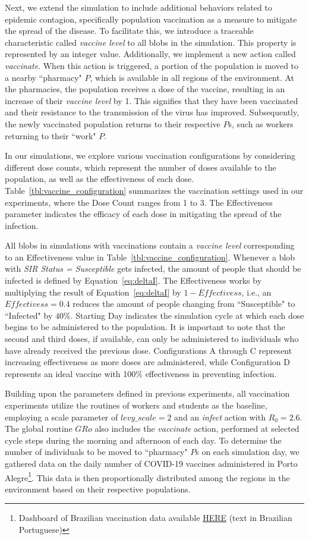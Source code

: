 \documentclass[pdflatex,sn-mathphys-num]{sn-jnl}%
\theoremstyle{thmstyleone}%
\theoremstyle{thmstyletwo}%
\theoremstyle{thmstylethree}%
\begin{document}
Next, we extend the simulation to include additional behaviors related to epidemic contagion, specifically population vaccination as a measure to mitigate the spread of the disease. To facilitate this, we introduce a traceable characteristic called \textit{vaccine level} to all blobs in the simulation. This property is represented by an integer value. Additionally, we implement a new action called \textit{vaccinate}. When this action is triggered, a portion of the population is moved to a nearby ``pharmacy" $P$, which is available in all regions of the environment. At the pharmacies, the population receives a dose of the vaccine, resulting in an increase of their \textit{vaccine level} by 1. This signifies that they have been vaccinated and their resistance to the transmission of the virus has improved. Subsequently, the newly vaccinated population returns to their respective $P$s, such as workers returning to their ``work" $P$.

In our simulations, we explore various vaccination configurations by considering different dose counts, which represent the number of doses available to the population, as well as the effectiveness of each dose. Table~\ref{tbl:vaccine_configuration} summarizes the vaccination settings used in our experiments, where the Dose Count ranges from 1 to 3. The Effectiveness parameter indicates the efficacy of each dose in mitigating the spread of the infection.

All blobs in simulations with vaccinations contain a \textit{vaccine level} corresponding to an Effectiveness value in Table~\ref{tbl:vaccine_configuration}. Whenever a blob with \textit{SIR Status = Susceptible} gets infected, the amount of people that should be infected is defined by Equation~\ref{eq:deltaI}. The Effectiveness works by multiplying the result of Equation~\ref{eq:deltaI} by $1-Effectivess$, i.e., an $Effectivess=0.4$ reduces the amount of people changing from ``Susceptible" to ``Infected" by $40\%$. Starting Day indicates the simulation cycle at which each dose begins to be administered to the population. It is important to note that the second and third doses, if available, can only be administered to individuals who have already received the previous dose. Configurations A through C represent increasing effectiveness as more doses are administered, while Configuration D represents an ideal vaccine with 100\% effectiveness in preventing infection.

Building upon the parameters defined in previous experiments, all vaccination experiments utilize the routines of workers and students as the baseline, employing a scale parameter of $levy\_scale = 2$ and an \textit{infect} action with $R_0 = 2.6$. The global routine $GRo$ also includes the \textit{vaccinate} action, performed at selected cycle steps during the morning and afternoon of each day. To determine the number of individuals to be moved to ``pharmacy" $P$s on each simulation day, we gathered data on the daily number of COVID-19 vaccines administered in Porto Alegre\footnote{Dashboard of Brazilian vaccination data available \href{https://vacina.saude.rs.gov.br/}{HERE} (text in Brazilian Portuguese)}. This data is then proportionally distributed among the regions in the environment based on their respective populations.
\end{document}
